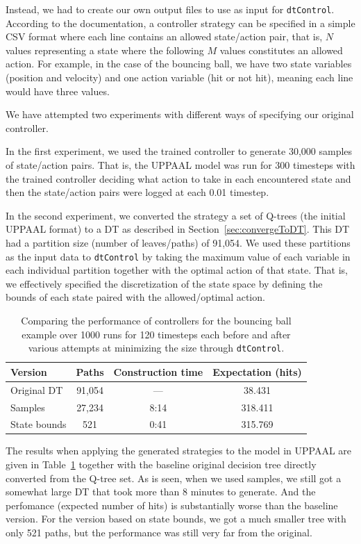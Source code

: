 \documentclass{article}
\begin{document}
Instead, we had to create our own output files to use as input for
\texttt{dtControl}. According to the documentation, a controller strategy can be
specified in a simple CSV format where each line contains an allowed
state/action pair, that is, $N$ values representing a state where the following
$M$ values constitutes an allowed action. For example, in the case of the
bouncing ball, we have two state variables (position and velocity) and one action
variable (hit or not hit), meaning each line would have three values.

We have attempted two experiments with different ways of specifying our original
controller.

In the first experiment, we used the trained controller to generate 30,000
samples of state/action pairs. That is, the UPPAAL model was run for 300
timesteps with the trained controller deciding what action to take in each
encountered state and then the state/action pairs were logged at each 0.01
timestep.

In the second experiment, we converted the strategy a set of Q-trees (the
initial UPPAAL format) to a DT as described in Section~\ref{sec:convergeToDT}.
This DT had a partition size (number of leaves/paths) of 91,054. We used these
partitions as the input data to \texttt{dtControl} by taking the maximum value
of each variable in each individual partition together with the optimal action
of that state. That is, we effectively specified the discretization of the state
space by defining the bounds of each state paired with the allowed/optimal
action.

\begin{table}[ht]
    \centering
    \caption{%
        Comparing the performance of controllers for the bouncing ball example
        over 1000 runs for 120 timesteps each before and after various attempts
        at minimizing the size through \texttt{dtControl}.  
    }\label{tab:dtcontrolTable}
    \begin{tabular}[t]{lccc}
        \toprule
        Version & Paths & Construction time & Expectation (hits) \\
        \midrule
        Original DT & 91,054 & --- & 38.431 \\
        Samples & 27,234 & 8:14 & 318.411 \\
        State bounds & 521 & 0:41 & 315.769 \\
        \bottomrule
    \end{tabular}
\end{table}


The results when applying the generated strategies to the model in UPPAAL are
given in Table~\ref{tab:dtcontrolTable} together with the baseline original
decision tree directly converted from the Q-tree set. As is seen, when we used
samples, we still got a somewhat large DT that took more than 8 minutes to
generate. And the perfomance (expected number of hits) is substantially worse
than the baseline version. For the version based on state bounds, we got a much
smaller tree with only 521 paths, but the performance was still very far from
the original.
\end{document}
